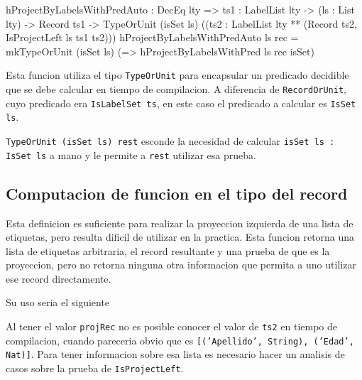 \begin{code}
hProjectByLabelsWithPredAuto : DecEq lty => 
  {ts1 : LabelList lty} -> (ls : List lty) -> 
  Record ts1 ->  TypeOrUnit (isSet ls) 
  ((ts2 : LabelList lty ** 
    (Record ts2, IsProjectLeft ls ts1 ts2)))
hProjectByLabelsWithPredAuto ls rec = 
  mkTypeOrUnit (isSet ls) 
  (\isSet => hProjectByLabelsWithPred ls rec isSet)
\end{code}

Esta funcion utiliza el tipo \texttt{TypeOrUnit} para encapsular un predicado decidible que se debe calcular en tiempo de compilacion. A diferencia de \texttt{RecordOrUnit}, cuyo predicado era \texttt{IsLabelSet ts}, en este caso el predicado a calcular es \texttt{IsSet ls}.

\texttt{TypeOrUnit (isSet ls) rest} esconde la necesidad de calcular \texttt{isSet ls : IsSet ls} a mano y le permite a \texttt{rest} utilizar esa prueba.

\subsection{Computacion de funcion en el tipo del record}

Esta definicion es suficiente para realizar la proyeccion izquierda de una lista de etiquetas, pero resulta dificil de utilizar en la practica. Esta funcion retorna una lista de etiquetas arbitraria, el record resultante y una prueba de que es la proyeccion, pero no retorna ninguna otra informacion que permita a uno utilizar ese record directamente.

Su uso seria el siguiente


Al tener el valor \texttt{projRec} no es posible conocer el valor de \texttt{ts2} en tiempo de compilacion, cuando pareceria obvio que es \texttt{[('Apellido', String), ('Edad', Nat)]}. Para tener informacion sobre esa lista es necesario hacer un analisis de casos sobre la prueba de \texttt{IsProjectLeft}.

